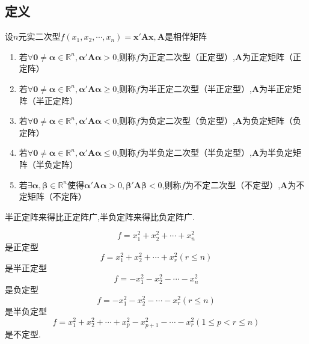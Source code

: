 \subsection{定义}
\begin{formal}
    \begin{definition}[正定型与负定型的定义]\label{def:正定型与负定型的定义}
        设$n$元实二次型$f\left(x_1,x_2,\cdots,x_n\right)=\bm{x}'\bm{Ax},\bm{A}$是相伴矩阵\begin{enumerate}[label={\textup{(\arabic*)}}]
            \item 若$\forall \bm{0}\neq\bm{\alpha}\in\mathbb{R}^n,\bm{\alpha}'\bm{A\alpha}>0$,则称$f$为正定二次型（正定型）,$\bm{A}$为正定矩阵（正定阵）
            \item 若$\forall \bm{0}\neq\bm{\alpha}\in\mathbb{R}^n,\bm{\alpha}'\bm{A\alpha}\geqslant 0$,则称$f$为半正定二次型（半正定型）,$\bm{A}$为半正定矩阵（半正定阵）
            \item 若$\forall \bm{0}\neq\bm{\alpha}\in\mathbb{R}^n,\bm{\alpha}'\bm{A\alpha}<0$,则称$f$为负定二次型（负定型）,$\bm{A}$为负定矩阵（负定阵）
            \item 若$\forall \bm{0}\neq\bm{\alpha}\in\mathbb{R}^n,\bm{\alpha}'\bm{A\alpha}\leqslant 0$,则称$f$为半负定二次型（半负定型）,$\bm{A}$为半负定矩阵（半负定阵）
            \item 若$\exists \bm{\alpha},\bm{\beta}\in\mathbb{R}^n$使得$\bm{\alpha}'\bm{A\alpha}>0,\bm{\beta}'\bm{A\beta}<0$,则称$f$为不定二次型（不定型）,$\bm{A}$为不定矩阵（不定阵）
        \end{enumerate}
    \end{definition}
\end{formal}
\begin{red}
    \begin{remark}
        半正定阵来得比正定阵广,半负定阵来得比负定阵广.
    \end{remark}
\end{red}
\begin{brown}
    \begin{example}\label{ex:3}
        \[
        f=x_1^2+x_2^2+\cdots+x_n^2
        \]是正定型\[
        f=x_1^2+x_2^2+\cdots+x_r^2\left(r\leqslant n\right)
        \]是半正定型\[
        f=-x_1^2-x_2^2-\cdots-x_n^2
        \]是负定型\[
        f=-x_1^2-x_2^2-\cdots-x_r^2\left(r\leqslant n\right)
        \]是半负定型\[
        f=x_1^2+x_2^2+\cdots+x_p^2-x_{p+1}^2-\cdots-x_r^2\left(1\leqslant p<r\leqslant n\right)
        \]是不定型.
    \end{example}
\end{brown}
